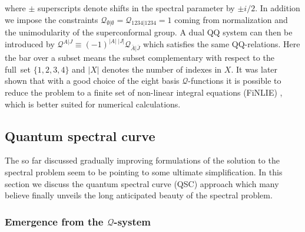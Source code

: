 where $\pm$ superscripts denote shifts in the spectral parameter by $\pm i/2$.
In addition we impose the constraints $\mathcal{Q}_{\emptyset |\emptyset}=\mathcal{Q}_{1234|1234}=1$ coming from normalization and the unimodularity of the superconformal group.
A dual QQ system can then be introduced by $\mathcal{Q}^{A|J}\equiv (-1)^{|A|\;|J|}\mathcal{Q}_{\bar A|\bar J}$ which satisfies the same QQ-relations.
Here  the bar over a subset means the subset complementary with respect to the full~set $\{1,2,3,4\}$ and  $|X|$ denotes the number of indexes in $X$. 
It was later shown that with a good choice of the eight basis $\mathcal{Q}$-functions it is possible to reduce the problem to a finite set of non-linear integral equations (FiNLIE) \cite{Gromov:2011cx}, which is better suited for numerical calculations.

\subsection{Quantum spectral curve}
\label{sec:pmu_system}

The so far discussed gradually improving formulations of the solution to the spectral problem seem to be pointing to some ultimate simplification.
In this section we discuss the quantum spectral curve (QSC) approach which many believe finally unveils the long anticipated beauty of the spectral problem.

\subsubsection{Emergence from the $\mathcal{Q}$-system}

